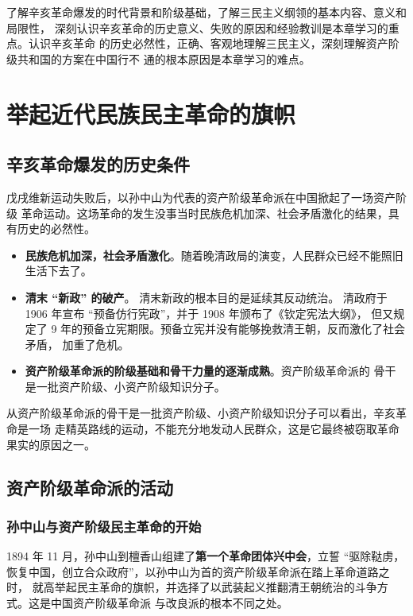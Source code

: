 \documentclass[10pt, UTF8]{book} %
\begin{document}
\quad\quad 
了解辛亥革命爆发的时代背景和阶级基础，了解三民主义纲领的基本内容、意义和局限性，
深刻认识辛亥革命的历史意义、失败的原因和经验教训是本章学习的重点。认识辛亥革命
的历史必然性，正确、客观地理解三民主义，深刻理解资产阶级共和国的方案在中国行不
通的根本原因是本章学习的难点。

\section{举起近代民族民主革命的旗帜}
\subsection{辛亥革命爆发的历史条件}

戊戌维新运动失败后，以孙中山为代表的资产阶级革命派在中国掀起了一场资产阶级
革命运动。这场革命的发生没事当时民族危机加深、社会矛盾激化的结果，具有历史的必然性。
\begin{itemize}[itemsep=0pt]
    \item \textbf{民族危机加深，社会矛盾激化}。随着晚清政局的演变，人民群众已经不能照旧
    生活下去了。
    \item \textbf{清末 “新政” 的破产}。
    清末新政的根本目的是延续其反动统治。
    清政府于 1906 年宣布 “预备仿行宪政”，并于 1908 年颁布了《钦定宪法大纲》，
    但又规定了 9 年的预备立宪期限。预备立宪并没有能够挽救清王朝，反而激化了社会矛盾，
    加重了危机。
    \item \textbf{资产阶级革命派的阶级基础和骨干力量的逐渐成熟}。资产阶级革命派的
    骨干是一批资产阶级、小资产阶级知识分子。
\end{itemize}
\begin{remark}
    从资产阶级革命派的骨干是一批资产阶级、小资产阶级知识分子可以看出，辛亥革命是一场
    走精英路线的运动，不能充分地发动人民群众，这是它最终被窃取革命果实的原因之一。
\end{remark}

\subsection{资产阶级革命派的活动}

\subsubsection{孙中山与资产阶级民主革命的开始}

1894 年 11 月，孙中山到檀香山组建了\textbf{第一个革命团体兴中会}，立誓
“驱除鞑虏，恢复中国，创立合众政府”，以孙中山为首的资产阶级革命派在踏上革命道路之时，
就高举起民主革命的旗帜，并选择了以武装起义推翻清王朝统治的斗争方式。这是中国资产阶级革命派
与改良派的根本不同之处。
\end{document}
